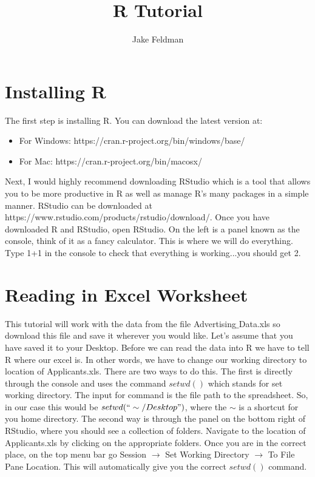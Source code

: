 \documentclass[11pt]{article}
\begin{document}
\title{R Tutorial}
\author{Jake Feldman}

\maketitle

\section{Installing R}

The first step is installing R.  You can download the latest version at: 

\begin{itemize}
\item For Windows: https://cran.r-project.org/bin/windows/base/
\item For Mac: https://cran.r-project.org/bin/macosx/
\end{itemize}

Next, I would highly recommend downloading RStudio which is a tool that allows you to be more productive in R as well as manage R's many packages in a simple manner.  RStudio can be downloaded at https://www.rstudio.com/products/rstudio/download/.  Once you have downloaded R and RStudio, open RStudio.  On the left is a panel known as the console, think of it as a fancy calculator.  This is where we will do everything. Type 1+1 in the console to check that everything is working...you should get 2.

\section{Reading in Excel Worksheet}

This tutorial will work with the data from the file Advertising$\_$Data.xls so download this file and save it wherever you would like.  Let's assume that you have saved it to your Desktop.  Before we can read the data into R we have to tell R where our excel is.  In other words, we have to change our working directory to location of Applicants.xls.  There are two ways to do this.  The first is directly through the console and uses the command $setwd()$ which stands for set working directory.  The input for command is the file path to the spreadsheet.  So, in our case this would be $setwd(``\sim/Desktop")$, where the $\sim$ is a shortcut for you home directory.  The second way is through the panel on the bottom right of RStudio, where you should see a collection of folders. Navigate to the location of Applicants.xls by clicking on the appropriate folders.  Once you are in the correct place, on the top menu bar go Session $\rightarrow$ Set Working Directory $\rightarrow$ To File Pane Location. This will automatically give you the correct $setwd()$ command.
\end{document}
